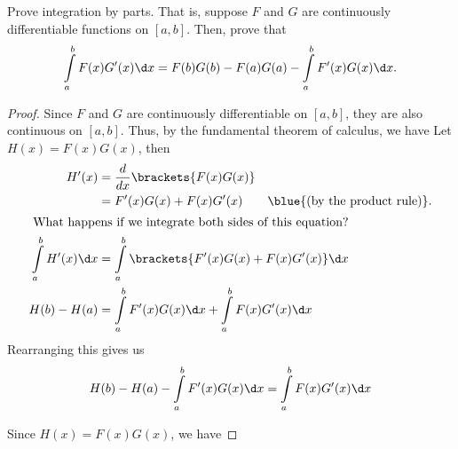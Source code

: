 \begin{problem}
  Prove integration by parts.
  That is, suppose $F$ and $G$ are continuously differentiable functions on $[a, b]$.
  Then, prove that
  \[
    \int\limits_a^b F(x)G'(x) \d x = F(b)G(b) - F(a)G(a) - \int\limits_a^b F'(x)G(x) \d x.
  \]
\end{problem}

\begin{answer}
  \begin{proof}
    Since $F$ and $G$ are continuously differentiable on $[a, b]$,
    they are also continuous on $[a, b]$.
    Thus, by the fundamental theorem of calculus, we have
    Let $H(x) = F(x)G(x)$, then
    \begin{align*}
      H'(x) &= \frac{d}{dx} \brackets{F(x)G(x)} \\
            &= F'(x)G(x) + F(x)G'(x) \qquad \blue{\text{(by the product rule)}}. \\
      \intertext{ What happens if we integrate both sides of this equation? }
      \int\limits_a^b H'(x) \d x &= \int\limits_a^b \brackets{F'(x)G(x) + F(x)G'(x)} \d x \\
      H(b) - H(a) &= \int\limits_a^b F'(x)G(x) \d x + \int\limits_a^b F(x)G'(x) \d x
    \end{align*}
    Rearranging this gives us
    \[
      H(b) - H(a) - \int\limits_a^b F'(x)G(x) \d x = \int\limits_a^b F(x)G'(x) \d x
    \]

    Since $H(x) = F(x)G(x)$, we have
    \blue{\[
      \int\limits_a^b F(x)G'(x) \d x = F(b)G(b) - F(a)G(a) - \int\limits_a^b F'(x)G(x) \d x
    \]}
  \end{proof}
\end{answer}
